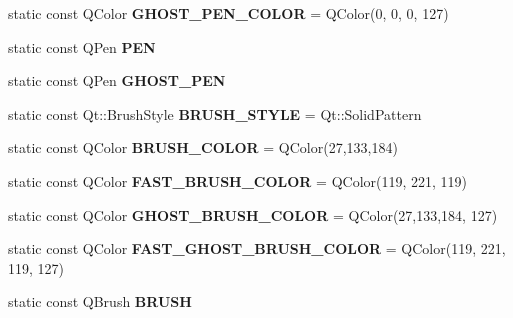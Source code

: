 \begin{DoxyCompactItemize}
\item 
\hypertarget{classCarGUI_acb446c6901b42114a46d8f1dc90f4688}{static const Q\-Color {\bfseries G\-H\-O\-S\-T\-\_\-\-P\-E\-N\-\_\-\-C\-O\-L\-O\-R} = Q\-Color(0, 0, 0, 127)}\label{classCarGUI_acb446c6901b42114a46d8f1dc90f4688}

\item 
\hypertarget{classCarGUI_a352bd9b2692ac49297643a854ffdb537}{static const Q\-Pen {\bfseries P\-E\-N}}\label{classCarGUI_a352bd9b2692ac49297643a854ffdb537}

\item 
\hypertarget{classCarGUI_a3ada4495d9bfecf7097aa3f42ad8756a}{static const Q\-Pen {\bfseries G\-H\-O\-S\-T\-\_\-\-P\-E\-N}}\label{classCarGUI_a3ada4495d9bfecf7097aa3f42ad8756a}

\item 
\hypertarget{classCarGUI_acc2a56343ab73144bca417ec16370c5c}{static const Qt\-::\-Brush\-Style {\bfseries B\-R\-U\-S\-H\-\_\-\-S\-T\-Y\-L\-E} = Qt\-::\-Solid\-Pattern}\label{classCarGUI_acc2a56343ab73144bca417ec16370c5c}

\item 
\hypertarget{classCarGUI_a9a50ecc06f437171f3961b5a671f01f1}{static const Q\-Color {\bfseries B\-R\-U\-S\-H\-\_\-\-C\-O\-L\-O\-R} = Q\-Color(27,133,184)}\label{classCarGUI_a9a50ecc06f437171f3961b5a671f01f1}

\item 
\hypertarget{classCarGUI_a0f2058112de433da200843c17e9c8e9e}{static const Q\-Color {\bfseries F\-A\-S\-T\-\_\-\-B\-R\-U\-S\-H\-\_\-\-C\-O\-L\-O\-R} = Q\-Color(119, 221, 119)}\label{classCarGUI_a0f2058112de433da200843c17e9c8e9e}

\item 
\hypertarget{classCarGUI_a4ba54f1295f2af07016f7a3a3e3fa6a7}{static const Q\-Color {\bfseries G\-H\-O\-S\-T\-\_\-\-B\-R\-U\-S\-H\-\_\-\-C\-O\-L\-O\-R} = Q\-Color(27,133,184, 127)}\label{classCarGUI_a4ba54f1295f2af07016f7a3a3e3fa6a7}

\item 
\hypertarget{classCarGUI_ab55f90d8af669b100b9cf262e6ff3e4c}{static const Q\-Color {\bfseries F\-A\-S\-T\-\_\-\-G\-H\-O\-S\-T\-\_\-\-B\-R\-U\-S\-H\-\_\-\-C\-O\-L\-O\-R} = Q\-Color(119, 221, 119, 127)}\label{classCarGUI_ab55f90d8af669b100b9cf262e6ff3e4c}

\item 
\hypertarget{classCarGUI_adb3513e5efe3da7e37ccf23879660697}{static const Q\-Brush {\bfseries B\-R\-U\-S\-H}}\label{classCarGUI_adb3513e5efe3da7e37ccf23879660697}


\end{DoxyCompactItemize}
